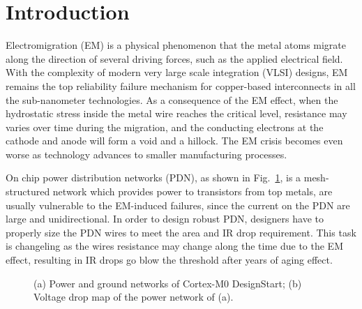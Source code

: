 \section{Introduction}
\label{sec:intro}
Electromigration (EM) is a physical phenomenon that the metal atoms migrate along the direction of several driving forces, such as the applied electrical field. 
With the complexity of modern very large scale integration (VLSI) designs, EM remains the top reliability failure mechanism for copper-based interconnects in all the sub-nanometer technologies.
As a consequence of the EM effect, when the hydrostatic stress inside the metal wire reaches the critical level, resistance may varies over time during the migration, and the conducting electrons at the cathode and anode will form a void and a hillock.
The EM crisis becomes even worse as technology advances to smaller manufacturing processes. 

On chip power distribution networks (PDN), as shown in Fig.~\ref{fig:pgimage}, is a mesh-structured network which provides power to transistors from top metals, are usually vulnerable to the EM-induced failures, since the current on the PDN are large and unidirectional. In order to design robust PDN, designers have to properly size the PDN wires to meet the area and IR drop requirement. This task is changeling as the wires resistance may change along the time due to the EM effect, resulting in IR drops go blow the threshold after years of aging effect.

\begin{figure}[htp]
	\centering
	\caption{(a) Power and ground networks of Cortex-M0 DesignStart; (b) Voltage drop map of the power network of (a).}
	\label{fig:pgimage}
\end{figure}


